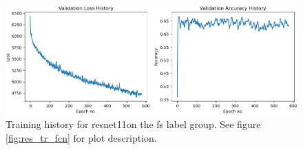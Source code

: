 \begin{figure}[h]
    \centering
    \includegraphics[width=\textwidth]{figures/res_tr_ResNet11_state.png}
    \caption{Training history for \acrlong{resnet11}on the \acrshort{fs} label group. See figure \ref{fig:res_tr_fcn} for plot description.}
    \label{fig:res_tr_resnet11}
\end{figure}
\FloatBarrier


\newpage
